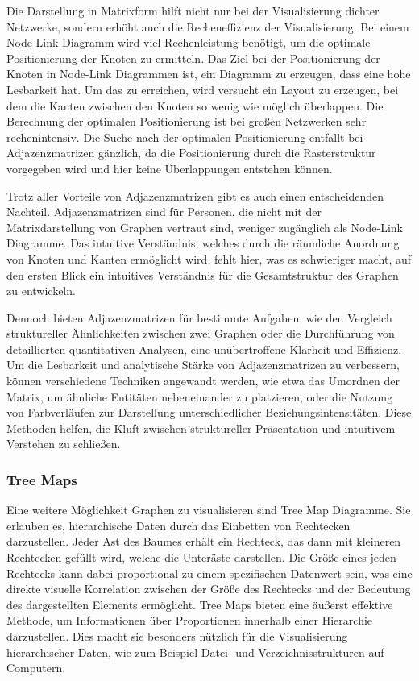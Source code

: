 Die Darstellung in Matrixform hilft nicht nur bei der Visualisierung dichter Netzwerke, sondern erhöht auch die Recheneffizienz der Visualisierung. Bei einem Node-Link Diagramm wird viel Rechenleistung benötigt, um die optimale Positionierung der Knoten zu ermitteln. Das Ziel bei der Positionierung der Knoten in Node-Link Diagrammen ist, ein Diagramm zu erzeugen, dass eine hohe Lesbarkeit hat. Um das zu erreichen, wird versucht ein Layout zu erzeugen, bei dem die Kanten zwischen den Knoten so wenig wie möglich überlappen. Die Berechnung der optimalen Positionierung ist bei großen Netzwerken sehr rechenintensiv. Die Suche nach der optimalen Positionierung entfällt bei Adjazenzmatrizen gänzlich, da die Positionierung durch die Rasterstruktur vorgegeben wird und hier keine Überlappungen entstehen können.

Trotz aller Vorteile von Adjazenzmatrizen gibt es auch einen entscheidenden Nachteil. Adjazenzmatrizen sind für Personen, die nicht mit der Matrixdarstellung von Graphen vertraut sind, weniger zugänglich als Node-Link Diagramme. Das intuitive Verständnis, welches durch die räumliche Anordnung von Knoten und Kanten ermöglicht wird, fehlt hier, was es schwieriger macht, auf den ersten Blick ein intuitives Verständnis für die Gesamtstruktur des Graphen zu entwickeln.

Dennoch bieten Adjazenzmatrizen für bestimmte Aufgaben, wie den Vergleich struktureller Ähnlichkeiten zwischen zwei Graphen oder die Durchführung von detaillierten quantitativen Analysen, eine unübertroffene Klarheit und Effizienz. Um die Lesbarkeit und analytische Stärke von Adjazenzmatrizen zu verbessern, können verschiedene Techniken angewandt werden, wie etwa das Umordnen der Matrix, um ähnliche Entitäten nebeneinander zu platzieren, oder die Nutzung von Farbverläufen zur Darstellung unterschiedlicher Beziehungsintensitäten. Diese Methoden helfen, die Kluft zwischen struktureller Präsentation und intuitivem Verstehen zu schließen.

\subsubsection{Tree Maps}

Eine weitere Möglichkeit Graphen zu visualisieren sind Tree Map Diagramme. Sie erlauben es, hierarchische Daten durch das Einbetten von Rechtecken darzustellen. Jeder Ast des Baumes erhält ein Rechteck, das dann mit kleineren Rechtecken gefüllt wird, welche die Unteräste darstellen. Die Größe eines jeden Rechtecks kann dabei proportional zu einem spezifischen Datenwert sein, was eine direkte visuelle Korrelation zwischen der Größe des Rechtecks und der Bedeutung des dargestellten Elements ermöglicht. Tree Maps bieten eine äußerst effektive Methode, um Informationen über Proportionen innerhalb einer Hierarchie darzustellen. Dies macht sie besonders nützlich für die Visualisierung hierarchischer Daten, wie zum Beispiel Datei- und Verzeichnisstrukturen auf Computern.


